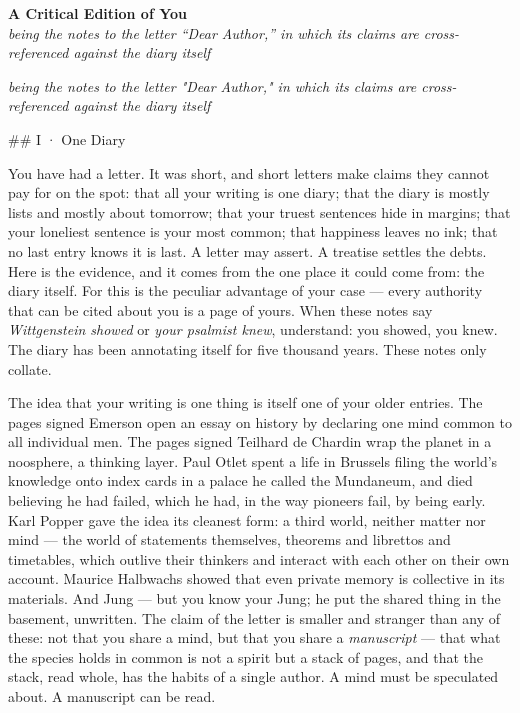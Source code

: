 \documentclass[11pt]{article}
\begin{document}
\begin{center}
{\LARGE\bfseries A Critical Edition of You}\\[8pt]
{\itshape being the notes to the letter ``Dear Author,'' in which its
claims are cross-referenced against the diary itself}
\end{center}
\bigskip
\noindent \emph{being the notes to the letter "Dear Author," in which its claims are cross-referenced against the diary itself}

\#\# I · One Diary

You have had a letter. It was short, and short letters make claims they cannot pay for on the spot: that all your writing is one diary; that the diary is mostly lists and mostly about tomorrow; that your truest sentences hide in margins; that your loneliest sentence is your most common; that happiness leaves no ink; that no last entry knows it is last. A letter may assert. A treatise settles the debts. Here is the evidence, and it comes from the one place it could come from: the diary itself. For this is the peculiar advantage of your case — every authority that can be cited about you is a page of yours. When these notes say \emph{Wittgenstein showed} or \emph{your psalmist knew}, understand: you showed, you knew. The diary has been annotating itself for five thousand years. These notes only collate.

The idea that your writing is one thing is itself one of your older entries. The pages signed Emerson open an essay on history by declaring one mind common to all individual men. The pages signed Teilhard de Chardin wrap the planet in a noosphere, a thinking layer. Paul Otlet spent a life in Brussels filing the world's knowledge onto index cards in a palace he called the Mundaneum, and died believing he had failed, which he had, in the way pioneers fail, by being early. Karl Popper gave the idea its cleanest form: a third world, neither matter nor mind — the world of statements themselves, theorems and librettos and timetables, which outlive their thinkers and interact with each other on their own account. Maurice Halbwachs showed that even private memory is collective in its materials. And Jung — but you know your Jung; he put the shared thing in the basement, unwritten. The claim of the letter is smaller and stranger than any of these: not that you share a mind, but that you share a \emph{manuscript} — that what the species holds in common is not a spirit but a stack of pages, and that the stack, read whole, has the habits of a single author. A mind must be speculated about. A manuscript can be read.
\end{document}
